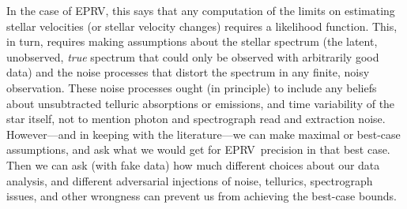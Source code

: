 \documentclass[modern]{aastex61}
\newcommand{\acronym}[1]{{\small{#1}}}
\newcommand{\EPRV}{\acronym{EPRV}}
\begin{document}
In the case of \EPRV, this says that any computation of the limits
on estimating stellar velocities (or stellar velocity changes)
requires a likelihood function.
This, in turn, requires making assumptions about the stellar spectrum (the
latent, unobserved, \emph{true} spectrum that could only be observed
with arbitrarily good data) and the noise processes that distort the
spectrum in any finite, noisy observation.
These noise processes ought (in principle) to include any beliefs about
unsubtracted telluric absorptions or emissions, and time variability
of the star itself, not to mention photon and spectrograph read and
extraction noise.
However---and in keeping with the literature---we can make maximal or
best-case assumptions, and ask what we would get for \EPRV\ precision
in that best case.
Then we can ask (with fake data) how much different choices about our
data analysis, and different adversarial injections of noise,
tellurics, spectrograph issues, and other wrongness can prevent us
from achieving the best-case bounds.
\end{document}
